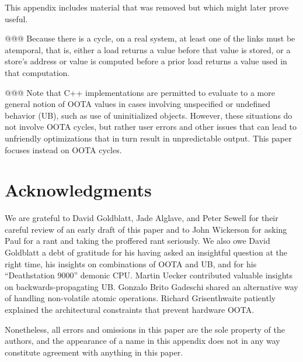 \documentclass[10]{article}
\begin{document}
This appendix includes material that was removed but which might later
prove useful.

@@@ Because there is a cycle, on a real system, at least one of the links
must be atemporal, that is, either a load returns a value before
that value is stored, or a store's address or value is computed before
a prior load returns a value used in that computation.

@@@ Note that C++ implementations are permitted to evaluate to a more
general notion of OOTA values in cases involving unspecified or undefined
behavior (UB), such as use of uninitialized objects.
However, these situations do not involve OOTA cycles, but rather user
errors and other issues that can lead to unfriendly optimizations that
in turn result in unpredictable output.
This paper focuses instead on OOTA cycles.


\clearpage

\section{Acknowledgments}
\label{sec:Acknowledgments}

We are grateful to David Goldblatt, Jade Alglave, and Peter
Sewell for their careful review of an early draft of this paper and
to John Wickerson for asking Paul for a rant and taking the proffered
rant seriously.
We also owe David Goldblatt a debt of gratitude for his having asked an
insightful question at the right time, his insights on combinations of
OOTA and UB, and for his ``Deathstation 9000'' demonic CPU.
Martin Uecker contributed valuable insights on backwards-propagating UB.
Gonzalo Brito Gadeschi shared an alternative way of handling non-volatile
atomic operations.
Richard Grisenthwaite patiently explained the architectural constraints
that prevent hardware OOTA.

Nonetheless, all errors and omissions in this paper are the sole property
of the authors, and the appearance of a name in this appendix does
not in any way constitute agreement with anything in this paper.
\end{document}
